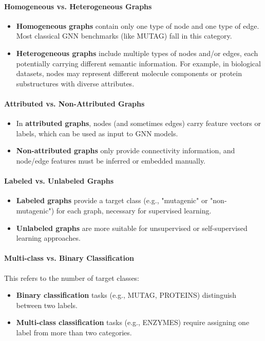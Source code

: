 \documentclass[11pt,a4paper]{article}
\begin{document}
	\paragraph{Homogeneous vs. Heterogeneous Graphs}
	\begin{itemize}
		\item \textbf{Homogeneous graphs} contain only one type of node and one type of edge. Most classical GNN benchmarks (like MUTAG) fall in this category.
		\item \textbf{Heterogeneous graphs} include multiple types of nodes and/or edges, each potentially carrying different semantic information. For example, in biological datasets, nodes may represent different molecule components or protein substructures with diverse attributes.
	\end{itemize}
	
	\paragraph{Attributed vs. Non-Attributed Graphs}
	\begin{itemize}
		\item In \textbf{attributed graphs}, nodes (and sometimes edges) carry feature vectors or labels, which can be used as input to GNN models.
		\item \textbf{Non-attributed graphs} only provide connectivity information, and node/edge features must be inferred or embedded manually.
	\end{itemize}
	
	\paragraph{Labeled vs. Unlabeled Graphs}
	\begin{itemize}
		\item \textbf{Labeled graphs} provide a target class (e.g., "mutagenic" or "non-mutagenic") for each graph, necessary for supervised learning.
		\item \textbf{Unlabeled graphs} are more suitable for unsupervised or self-supervised learning approaches.
	\end{itemize}
	
	\paragraph{Multi-class vs. Binary Classification}
	This refers to the number of target classes:
	\begin{itemize}
		\item \textbf{Binary classification} tasks (e.g., MUTAG, PROTEINS) distinguish between two labels.
		\item \textbf{Multi-class classification} tasks (e.g., ENZYMES) require assigning one label from more than two categories.
	\end{itemize}
	
\end{document}
